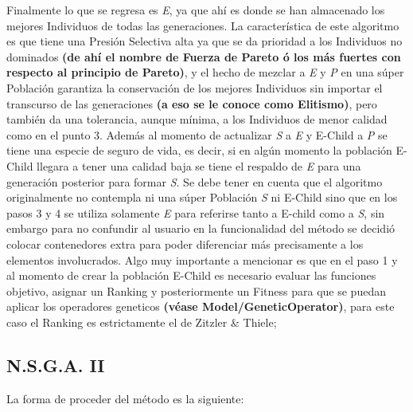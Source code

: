 \documentclass[class=report, crop=false]{standalone}
\begin{document}
Finalmente lo que se regresa es \emph{E}, ya que ahí es 
donde se han almacenado los mejores Individuos de todas 
las generaciones.\medskip\break
La característica de este algoritmo es que tiene una 
Presión Selectiva alta ya que se da prioridad a los 
Individuos no dominados \textbf{(de ahí el nombre de Fuerza de Pareto ó los más fuertes con respecto al principio de Pareto)},
y el hecho de mezclar a \emph{E} y \emph{P} en una 
súper Población garantiza la conservación de los mejores 
Individuos sin importar el transcurso de las generaciones \textbf{(a eso se le conoce como Elitismo)}, 
pero también da una tolerancia, aunque mínima, a los Individuos 
de menor calidad como en el punto 3.\break
Además al momento de actualizar \emph{S} a \emph{E} y 
E-Child a \emph{P} se tiene una especie de seguro de vida, 
es decir, si en algún momento la población E-Child llegara a
tener una calidad baja se tiene el respaldo de \emph{E} 
para una generación posterior para formar \emph{S}.\medskip\break
Se debe tener en cuenta que el algoritmo originalmente no 
contempla ni una súper Población \emph{S} ni E-Child 
sino que en los pasos 3 y 4 se utiliza solamente \emph{E} 
para referirse tanto a E-child como a \emph{S}, sin embargo 
para no confundir al usuario en la funcionalidad del método 
se decidió colocar contenedores extra para poder diferenciar 
más precisamente a los elementos involucrados.\medskip\break
Algo muy importante a mencionar es que en el paso 1 y al momento 
de crear la población E-Child es necesario evaluar las funciones 
objetivo, asignar un Ranking y posteriormente un Fitness para 
que se puedan aplicar los operadores geneticos \textbf{(véase Model/GeneticOperator)}, 
para este caso el Ranking es estrictamente el de Zitzler \& Thiele; 

\subsection{N.S.G.A. II}
La forma de proceder del método es la siguiente:
\end{document}
